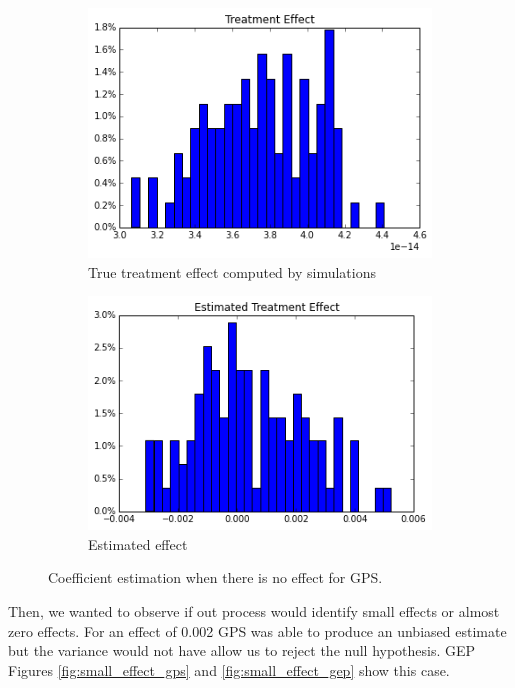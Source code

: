 \documentclass[11pt]{article}
\begin{document}
\begin{figure}[h]
\centering
\begin{subfigure}{.5\textwidth}
  \centering
  \includegraphics[width=.9\linewidth]{treatment_effect_no_influence_real.png}
  \caption{True treatment effect computed by simulations}
  \label{fig:sub1}
\end{subfigure}%
\begin{subfigure}{.5\textwidth}
  \centering
  \includegraphics[width=.9\linewidth]{estimated_no_influence_gep.png}
  \caption{Estimated effect}
  \label{fig:sub2}
\end{subfigure}
\caption{Coefficient estimation when there is no effect for GPS.}
\label{fig:no_effect_gps}
\end{figure}

Then, we  wanted to observe if out process would identify small effects or almost zero effects. For an effect of 0.002 GPS was able to produce an unbiased estimate but the variance would not have allow us to reject the null hypothesis. GEP  Figures \ref{fig:small_effect_gps} and \ref{fig:small_effect_gep} show this case. 
\end{document}

